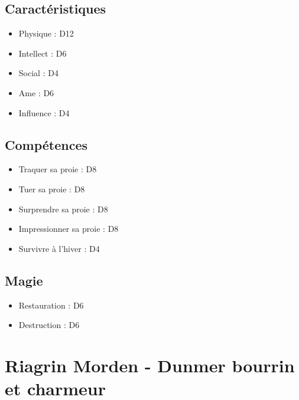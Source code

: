\documentclass{Tamriel}
\begin{document}
\begin{multicols*}{2}
        \section*{Caractéristiques}

        \begin{itemize}
        \item Physique : D12
        \item Intellect : D6
        \item Social : D4
        \item Ame : D6
        \item Influence : D4
        \end{itemize}

        \section*{Compétences}

        \begin{itemize}
        \item Traquer sa proie : D8
        \item Tuer sa proie : D8
        \item Surprendre sa proie : D8
        \item Impressionner sa proie : D8
        \item Survivre à l'hiver : D4
        \end{itemize}
        
        \section*{Magie}

        \begin{itemize}
        \item Restauration : D6
        \item Destruction : D6
        \end{itemize}

\end{multicols*}

\chapter*{Riagrin Morden - Dunmer bourrin et charmeur}
\end{document}
